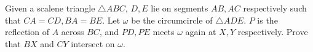 Given a scalene triangle $\triangle ABC$, $D,E$ lie on segments $AB,AC$ respectively such that $CA=CD, BA=BE$. Let $\omega$ be the circumcircle of $\triangle ADE$. $P$ is the reflection of $A$ across $BC$, and $PD,PE$ meets $\omega$ again at $X,Y$ respectively. Prove that $BX$ and $CY$ intersect on $\omega$.